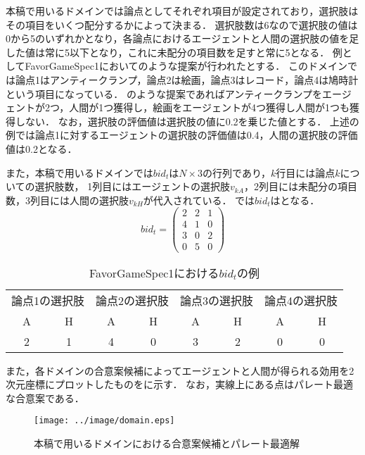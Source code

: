 本稿で用いるドメインでは論点としてそれぞれ項目が設定されており，選択肢はその項目をいくつ配分するかによって決まる．
選択肢数は6なので選択肢の値は0から5のいずれかとなり，各論点におけるエージェントと人間の選択肢の値を足した値は常に5以下となり，これに未配分の項目数を足すと常に5となる．
例としてFavorGameSpec1においてのような提案が行われたとする．
このドメインでは論点1はアンティークランプ，論点2は絵画，論点3はレコード，論点4は鳩時計という項目になっている．
のような提案であればアンティークランプをエージェントが2つ，人間が1つ獲得し，絵画をエージェントが4つ獲得し人間が1つも獲得しない．
なお，選択肢の評価値は選択肢の値に0.2を乗じた値とする．
上述の例では論点1に対するエージェントの選択肢の評価値は0.4，人間の選択肢の評価値は0.2となる．

また，本稿で用いるドメインでは$bid_t$は$N \times 3$の行列であり，$k$行目には論点$k$についての選択肢数，
1列目にはエージェントの選択肢$v_{kA}$，2列目には未配分の項目数，3列目には人間の選択肢$v_{kH}$が代入されている．
では$bid_t$はとなる．
\begin{equation}
    bid_t = \left(
    \begin{array}{rrr}
        2 & 2 & 1 \\
        4 & 1 & 0 \\
        3 & 0 & 2 \\
        0 & 5 & 0
    \end{array}
    \right)
    \label{eq:bid_ex}
\end{equation}

\begin{table}[tb]
  \centering
  \caption{FavorGameSpec1における$bid_t$の例}
  \begin{tabular}{cccccccc} \toprule
      \multicolumn{2}{c}{論点1の選択肢} & \multicolumn{2}{c}{論点2の選択肢} & \multicolumn{2}{c}{論点3の選択肢} & \multicolumn{2}{c}{論点4の選択肢} \\
      A & H & A & H & A & H & A & H \\ \midrule
      2 & 1 & 4 & 0 & 3 & 2 & 0 & 0 \\ \bottomrule
  \end{tabular}
  \label{tab:bid_ex}
\end{table}

また，各ドメインの合意案候補によってエージェントと人間が得られる効用を2次元座標にプロットしたものをに示す．
なお，実線上にある点はパレート最適な合意案である．

\begin{figure}[htb]
  \centering
  \texttt{[image: ../image/domain.eps]}
  \caption{本稿で用いるドメインにおける合意案候補とパレート最適解}
  \label{fig:domain}
\end{figure}

